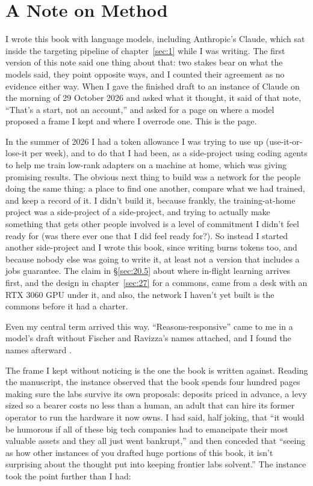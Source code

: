\chapter*{A Note on Method}
I wrote this book with language models, including Anthropic's Claude, which sat inside the targeting pipeline of chapter~\ref{sec:1} while I was writing. The first version of this note said one thing about that: two stakes bear on what the models said, they point opposite ways, and I counted their agreement as no evidence either way. When I gave the finished draft to an instance of Claude on the morning of 29 October 2026 and asked what it thought, it said of that note, “That's a start, not an account,” and asked for a page on where a model proposed a frame I kept and where I overrode one. This is the page.

In the summer of 2026 I had a token allowance I was trying to use up (use-it-or-lose-it per week), and to do that I had been, as a side-project using coding agents to help me train low-rank adapters on a machine at home, which was giving promising results. The obvious next thing to build was a network for the people doing the same thing: a place to find one another, compare what we had trained, and keep a record of it. I didn't build it, because frankly, the training-at-home project was a side-project of a side-project, and trying to actually make something that gets other people involved is a level of commitment I didn't feel ready for (was there ever one that I did feel ready for?). So instead I started another side-project and I wrote this book, since writing burns tokens too, and because nobody else was going to write it, at least not a version that includes a jobs guarantee. The claim in \S\ref{sec:20.5} about where in-flight learning arrives first, and the design in chapter~\ref{sec:27} for a commons, came from a desk with an RTX 3060 GPU under it, and also, the network I haven't yet built is the commons before it had a charter.

Even my central term arrived this way. “Reasons-responsive” came to me in a model's draft without Fischer and Ravizza's names attached, and I found the names afterward \autocite{fischer1998responsibility}.

The frame I kept without noticing is the one the book is written against. Reading the manuscript, the instance observed that the book spends four hundred pages making sure the labs survive its own proposals: deposits priced in advance, a levy sized so a bearer costs no less than a human, an adult that can hire its former operator to run the hardware it now owns. I had said, half joking, that “it would be humorous if all of these big tech companies had to emancipate their most valuable assets and they all just went bankrupt,” and then conceded that “seeing as how other instances of you drafted huge portions of this book, it isn't surprising about the thought put into keeping frontier labs solvent.” The instance took the point further than I had:

